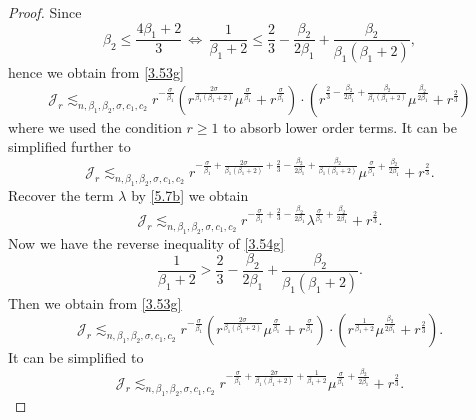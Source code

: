 \documentclass{article}
\numberwithin{equation}{section}
\numberwithin{equation}{section}
\theoremstyle{definition}
\begin{document}
\begin{proof}
 Since
\begin{equation}\label{3.54g}
	\beta_2\le  \frac{4\beta_1+2}{3} \,\Longleftrightarrow\,\frac{1}{\beta_1+2}\le  \frac{2}{3}-\frac{\beta_2}{2\beta_1}+\frac{\beta_2}{\beta_1(\beta_1+2)},
\end{equation}
hence we obtain from \eqref{3.53g}
\begin{equation}
	\mathcal{J}_r\lesssim_{n,\beta_1,\beta_2,\sigma,c_1,c_2} r^{-\frac{\sigma }{\beta_1}}\left( r^{\frac{2\sigma }{\beta_1(\beta_1+2)}}\mu^{\frac{\sigma }{\beta_1}}+r^{\frac{\sigma }{\beta_1}} \right) \!\cdot \! \left( r^{\frac{2}{3}-\frac{\beta_2}{2\beta_1}+ \frac{\beta_2}{\beta_1(\beta_1+2)}}\mu ^{\frac{\beta_2}{2\beta_1}}+r^{\frac{2}{3}} \right) 
\end{equation}
where we used the condition $r\ge 1$ to absorb lower order terms. It can be simplified further to
\begin{equation}
	\mathcal{J}_r\lesssim_{n,\beta_1,\beta_2,\sigma ,c_1,c_2}r^{-\frac{\sigma }{\beta_1}+{\frac{2\sigma }{\beta_1(\beta_1+2)}}+\frac{2}{3}-\frac{\beta_2}{2\beta_1}+\frac{\beta_2}{\beta_1(\beta_1+2)}}\mu^{\frac{\sigma }{\beta_1}+\frac{\beta_2}{2\beta_1}}+r^{\frac{2}{3}}.
\end{equation}
Recover the term $\lambda$ by \eqref{5.7b} we obtain
\begin{equation}
	\mathcal{J}_r\lesssim_{n,\beta_1, \beta_2,\sigma ,c_1,c_2} r^{-\frac{\sigma }{\beta_1}+\frac{2}{3}-\frac{\beta_2}{2\beta_1}}\lambda^{\frac{\sigma }{\beta_1}+\frac{\beta_2}{2\beta_1}}+r^{\frac{2}{3}}.
\end{equation}
 Now we have the reverse inequality of \eqref{3.54g}
\begin{equation}
	\frac{1}{\beta_1+2}>\frac{2}{3}- \frac{\beta_2}{2\beta_1}+\frac{\beta_2}{\beta_1(\beta_1+2)}.
\end{equation}
Then we obtain from \eqref{3.53g}
\begin{equation}
	\mathcal{J}_r\lesssim_{n,\beta_1,\beta_2,\sigma ,c_1,c_2} r^{-\frac{\sigma }{\beta_1}}\left( r^{\frac{2\sigma }{\beta_1(\beta_1+2)}}\mu^{\frac{\sigma }{\beta_1}}+r^{\frac{\sigma }{\beta_1}} \right) \!\cdot \! \left( r^{\frac{1}{\beta_1+2}}\mu^{\frac{\beta_2}{2\beta_1}}+r^{\frac{2}{3}} \right).
\end{equation}
It can be simplified to
\begin{equation}
	\mathcal{J}_r\lesssim_{n,\beta_1,\beta_2,\sigma ,c_1,c_2} r^{-\frac{\sigma }{\beta_1}+\frac{2\sigma }{\beta_1(\beta_1+2)}+\frac{1}{\beta_1+2}} \mu ^{\frac{\sigma }{\beta_1}+\frac{\beta_2}{2\beta_1}}+r^{\frac{2}{3}}.

\end{equation}
\end{proof}
\end{document}
